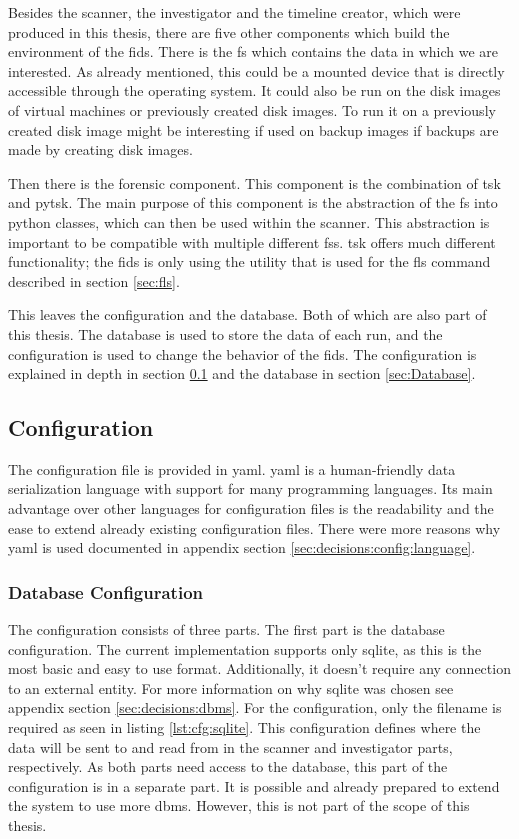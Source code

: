 Besides the scanner, the investigator and the timeline creator, which were produced in this thesis, there are five other components which build the environment of the \gls{fids}. There is the \gls{fs} which contains the data in which we are interested. As already mentioned, this could be a mounted device that is directly accessible through the operating system. It could also be run on the disk images of virtual machines or previously created disk images. To run it on a previously created disk image might be interesting if used on backup images if backups are made by creating disk images. 

Then there is the forensic component. This component is the combination of \gls{tsk} and \gls{pytsk}. The main purpose of this component is the abstraction of the \gls{fs} into python classes, which can then be used within the scanner. This abstraction is important to be compatible with multiple different \glspl{fs}. \gls{tsk} offers much different functionality; the \gls{fids} is only using the utility that is used for the fls command described in section \ref{sec:fls}. 

This leaves the configuration and the database. Both of which are also part of this thesis. The database is used to store the data of each run, and the configuration is used to change the behavior of the \gls{fids}. The configuration is explained in depth in section \ref{sec:Configuration} and the database in section \ref{sec:Database}.

\subsection{Configuration}
\label{sec:Configuration}

The configuration file is provided in \gls{yaml}. \gls{yaml} is a human-friendly data serialization language with support for many programming languages. Its main advantage over other languages for configuration files is the readability and the ease to extend already existing configuration files. There were more reasons why \gls{yaml} is used documented in appendix section \ref{sec:decisions:config:language}.

\subsubsection{Database Configuration}

The configuration consists of three parts. The first part is the database configuration. The current implementation supports only \gls{sqlite}, as this is the most basic and easy to use format. Additionally, it doesn't require any connection to an external entity. For more information on why \gls{sqlite} was chosen see appendix section \ref{sec:decisions:dbms}. For the configuration, only the filename is required as seen in listing \ref{lst:cfg:sqlite}. This configuration defines where the data will be sent to and read from in the scanner and investigator parts, respectively. As both parts need access to the database, this part of the configuration is in a separate part. It is possible and already prepared to extend the system to use more \gls{dbms}. However, this is not part of the scope of this thesis.

